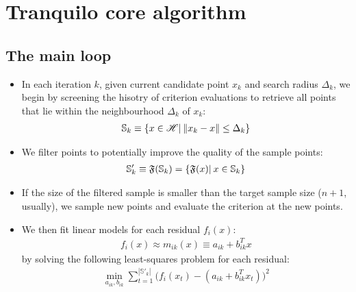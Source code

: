 \section{Tranquilo core algorithm}


\subsection{The main loop}
\begin{itemize}
    \item In each iteration $k$, given current candidate point $x_k$ and search radius $\Delta_k$, we begin by screening the hisotry of criterion evaluations to retrieve all points that lie within the neighbourhood $\Delta_k$ of $x_k$:
            \begin{align}
                \mathbb{S}_k\equiv\{x\in\mathscr{H}|\hspace{0.2em}\lVert x_k-x\rVert\leq\Delta_k\}
                \label{eq:hist-search}
            \end{align}
        \item We filter points to potentially improve the quality of the sample points:
            \begin{align}
                \mathbb{S}'_k\equiv\mathfrak{F}(\mathbb{S}_k) = \{\mathfrak{F}(x)|\hspace{0.2em} x\in \mathbb{S}_k\}
                \label{eq:filtering}
            \end{align}
        \item If the size of the filtered sample is smaller than the target sample size ($n+1$, usually), we sample new points and evaluate the criterion at the new points.
    \item We then fit linear models for each residual $f_i(x)$:
            \begin{align}
                f_i(x)\approx m_{ik}(x) \equiv a_{ik}+b_{ik}^Tx
                \label{eq:model-linear}
            \end{align}
    by solving the following least-squares problem for each residual:
            \begin{align}
                \min\limits_{a_{ik},b_{ik}}\sum\limits_{t=1}^{|\mathbb{S}'_k|}\big(f_i(x_t)-(a_{ik}+b_{ik}^Tx_t)\big)^2
                \label{eq:fit-linear}
            \end{align}


\end{itemize}
